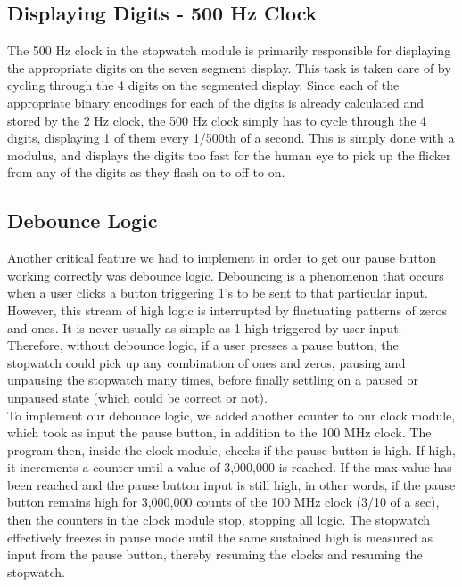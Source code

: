 \documentclass{article}
\begin{document}
\subsection*{Displaying Digits - 500 Hz Clock}

The 500 Hz clock in the stopwatch module is primarily responsible for displaying the appropriate digits on the seven segment display.  This task is taken care of by cycling through the 4 digits on the segmented display.  Since each of the appropriate binary encodings for each of the digits is already calculated and stored by the 2 Hz clock, the 500 Hz clock simply has to cycle through the 4 digits, displaying 1 of them every 1/500th of a second.  This is simply done with a modulus, and displays the digits too fast for the human eye to pick up the flicker from any of the digits as they flash on to off to on.

\subsection*{Debounce Logic}

Another critical feature we had to implement in order to get our pause button working correctly was debounce logic.  Debouncing is a phenomenon that occurs when a user clicks a button triggering 1's to be sent to that particular input.  However, this stream of high logic is interrupted by fluctuating patterns of zeros and ones.  It is never usually as simple as 1 high triggered by user input.  Therefore, without debounce logic, if a user presses a pause button, the stopwatch could pick up any combination of ones and zeros, pausing and unpausing the stopwatch many times, before finally settling on a paused or unpaused state (which could be correct or not). \\

To implement our debounce logic, we added another counter to our clock module, which took as input the pause button, in addition to the 100 MHz clock.  The program then, inside the clock module, checks if the pause button is high.  If high, it increments a counter until a value of 3,000,000 is reached.  If the max value has been reached and the pause button input is still high, in other words, if the pause button remains high for 3,000,000 counts of the 100 MHz clock (3/10 of a sec), then the counters in the clock module stop, stopping all logic.  The stopwatch effectively freezes in pause mode until the same sustained high is measured as input from the pause button, thereby resuming the clocks and resuming the stopwatch.
\end{document}
